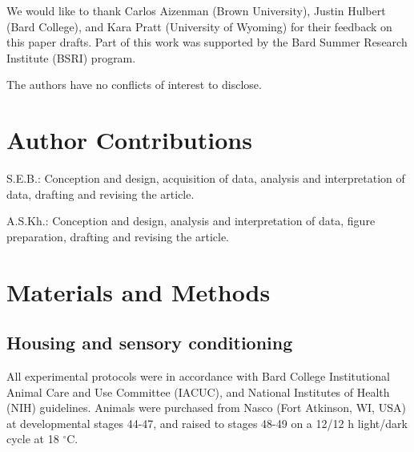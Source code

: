 \documentclass{article}
\begin{document}
We would like to thank Carlos Aizenman (Brown University), Justin Hulbert (Bard College), and Kara Pratt (University of Wyoming) for their feedback on this paper drafts. Part of this work was supported by the Bard Summer Research Institute (BSRI) program.


The authors have no conflicts of interest to disclose.

\section*{Author Contributions}

S.E.B.: Conception and design, acquisition of data, analysis and interpretation of data, drafting and revising the article. 

A.S.Kh.: Conception and design, analysis and interpretation of data, figure preparation, drafting and revising the article.

\section*{Materials and Methods}


\subsection*{Housing and sensory conditioning}

All experimental protocols were in accordance with Bard College Institutional Animal Care and Use Committee (IACUC), and National Institutes of Health (NIH) guidelines. Animals were purchased from Nasco (Fort Atkinson, WI, USA) at developmental stages 44-47, and raised to stages 48-49 on a 12/12 h light/dark cycle at 18 $^{\circ}$C. 
\end{document}
